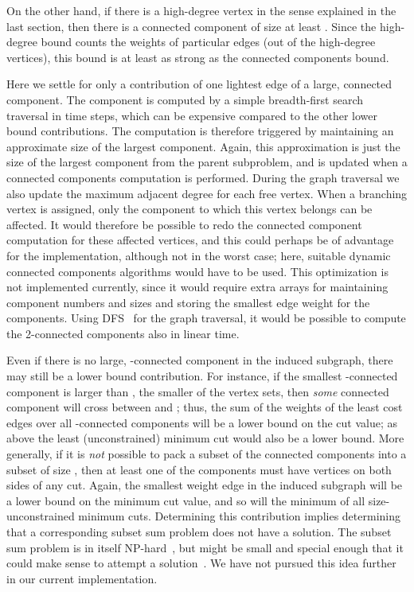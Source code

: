 \documentclass[a4paper,11pt]{article}
\begin{document}
On the other hand, if there is a high-degree vertex in the sense
explained in the last section, then there is a connected component of
size at least . Since the high-degree bound counts the
weights of particular edges (out of the high-degree vertices), this
bound is at least as strong as the connected components bound.

Here we settle for only a contribution of one lightest edge of a
large, connected component. The component is computed by a simple
breadth-first search traversal in  time steps, which can be
expensive compared to the other lower bound contributions.  The
computation is therefore triggered by maintaining an approximate size
of the largest component. Again, this approximation is just the size
of the largest component from the parent subproblem, and is updated
when a connected components computation is performed. During the graph
traversal we also update the maximum adjacent degree for each free
vertex. When a branching vertex is assigned, only the component to
which this vertex belongs can be affected. It would therefore be
possible to redo the connected component computation for these
affected vertices, and this could perhaps be of advantage for the
implementation, although not in the worst case; here, suitable dynamic
connected components algorithms would have to be used. This
optimization is not implemented currently, since it would require
extra arrays for maintaining component numbers and sizes and storing
the smallest edge weight for the components. Using DFS~\cite{Tarjan72}
for the graph traversal, it would be possible to compute the
2-connected components also in linear time.

Even if there is no large, -connected component in the induced
subgraph, there may still be a lower bound contribution. For instance,
if the smallest -connected component is larger than , the
smaller of the vertex sets, then \emph{some} connected component will
cross between  and ; thus, the sum
of the weights of the  least cost edges over all -connected
components will be a lower bound on the cut value; as above the least
(unconstrained) minimum cut would also be a lower bound. More
generally, if it is \emph{not} possible to pack a subset of the
connected components into a subset of size , then at least one of
the components must have vertices on both sides of any cut. Again, the
smallest weight edge in the induced subgraph will be a lower bound on
the minimum cut value, and so will the minimum of all
size-unconstrained minimum cuts. Determining this contribution implies
determining that a corresponding subset sum problem does not have a
solution.  The subset sum problem is in itself
NP-hard~\cite{GareyJohnson79}, but might be small and special enough
that it could make sense to attempt a solution~\cite{Pisinger99}. We
have not pursued this idea further in our current implementation.
\end{document}
